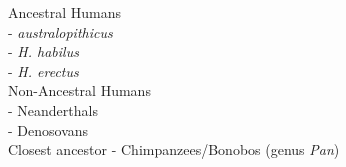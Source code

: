 \documentclass[12pt]{article}
\begin{document}
\begin{itemize}
\begin{itemize}
\begin{itemize}
\begin{itemize}
                    Ancestral Humans \\
                    - \textit{australopithicus} \\
                    - \textit{H. habilus} \\
                    - \textit{H. erectus} \\
                    Non-Ancestral Humans \\
                    - Neanderthals \\
                    - Denosovans \\
                    Closest ancestor - Chimpanzees/Bonobos (genus \textit{Pan})
                \end{itemize}
            \end{itemize}
        \end{itemize}
    \end{itemize}
\end{document}
